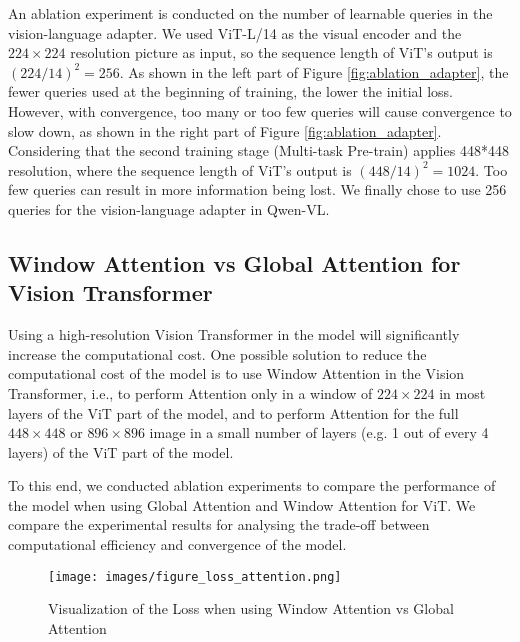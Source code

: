 \documentclass{article}
\begin{document}
An ablation experiment is conducted on the number of learnable queries in the vision-language adapter. We used ViT-L/14 as the visual encoder and the $224\times224$ resolution picture as input, so the sequence length of ViT's output is $(224/14)^2=256$. As shown in the left part of Figure \ref{fig:ablation_adapter}, the fewer queries used at the beginning of training, the lower the initial loss. However, with convergence, too many or too few queries will cause convergence to slow down, as shown in the right part of Figure \ref{fig:ablation_adapter}. Considering that the second training stage (Multi-task Pre-train) applies 448*448 resolution, where the sequence length of ViT's output is $(448/14)^2=1024$. Too few queries can result in more information being lost. We finally chose to use 256 queries for the vision-language adapter in Qwen-VL.

\subsection{Window Attention vs Global Attention for Vision Transformer}
\label{app:window_attention}

Using a high-resolution Vision Transformer in the model will significantly increase the computational cost. One possible solution to reduce the computational cost of the model is to use Window Attention in the Vision Transformer, i.e., to perform Attention only in a window of $224 \times 224$ in most layers of the ViT part of the model, and to perform Attention for the full $448 \times 448$ or $896 \times 896$ image in a small number of layers (e.g. 1 out of every 4 layers) of the ViT part of the model.

To this end, we conducted ablation experiments to compare the performance of the model when using Global Attention and Window Attention for ViT. We compare the experimental results for analysing the trade-off between computational efficiency and convergence of the model.

\begin{figure*}[ht]
\centering
\texttt{[image: images/figure\_loss\_attention.png]}
   \caption{Visualization of the Loss when using Window Attention vs Global Attention}
\label{fig:ablation_attention}
\end{figure*}
\end{document}

